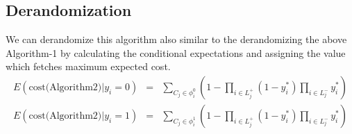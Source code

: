 \documentclass[10pt]{article}
\begin{document}
\subsection{Derandomization}
We can derandomize this algorithm also similar to the derandomizing the above Algorithm-1 by calculating the conditional expectations and assigning the 
value which fetches maximum expected cost.
\begin{eqnarray}
E(\mbox{cost(Algorithm2)} | y_i = 0) & = &\sum_{C_j \in \phi_i^0} ( 1 - \prod_{i\in L_j^+}(1 - y_i^*) \prod_{i \in L_j^-} y_i^*) \nonumber \\
E(\mbox{cost(Algorithm2)} | y_i = 1) & = &\sum_{C_j \in \phi_i^1} ( 1 - \prod_{i\in L_j^+}(1 - y_i^*) \prod_{i \in L_j^-} y_i^*) \nonumber
\end{eqnarray}

%
%
\end{document}
